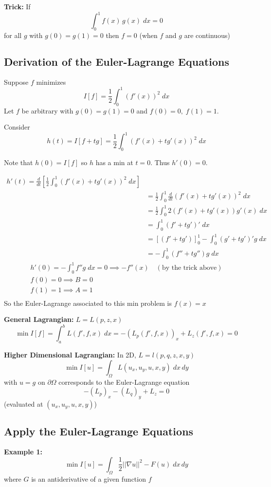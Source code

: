 \documentclass[10pt]{article}
\begin{document}
\textbf{Trick:} If 
\[\int_0^1 f(x)\, g(x)\; dx =0\]
for all $g$ with $g(0) = g(1) = 0$ then $f = 0$ (when $f$ and $g$ are continuous)

\subsection{Derivation of the Euler-Lagrange Equations}
Suppose $f$ minimizes 
\[I[f] = \frac{1}{2}\int_0^1 (f'(x))^2\; dx\]
Let $f$ be arbitrary with $g(0) = g(1) = 0$ and $f(0) = 0, \; f(1) = 1$. 

Consider 
\[h(t) = I[f + tg] = \frac{1}{2}\int_0^1 (f'(x) + tg'(x))^2\; dx\]

Note that $h(0) = I[f]$ so $h$ has a min at $t= 0$. Thus $h'(0) = 0$.

\begin{align*}
    h'(t) = \frac{d}{dt}\left[\frac{1}{2}\int_0^1(f'(x) + tg'(x))^2\; dx\right]\\
    &= \frac{1}{2}\int_0^1 \frac{d}{dt}(f'(x)+ tg'(x))^2\; dx\\
    &= \frac{1}{2}\int_0^1 2(f'(x) + tg'(x))g'(x)\; dx\\
    &= \int_0^1 (f' + tg')'\; dx\\
    &= [(f' + tg')]_0^1 - \int_0^1(g' + tg')' g\; dx\\
    &= -\int_0^1 (f'' + tg'')g\; dx
\end{align*}
\begin{gather*}
    h'(0) = -\int_0^1f''g\; dx = 0 \implies -f''(x) \quad (\text{by the trick above})\\
    f(0) = 0 \implies B =0\\
    f(1) = 1 \implies A = 1\\
\end{gather*}
So the Euler-Lagrange associated to this min problem is $f(x) = x$

\textbf{General Lagrangian:} $L = L(p,z,x)$ 
\[\min I[f] = \int_a^b L(f', f, x)\; dx = -(L_p(f', f, x))_x + L_z(f', f, x) = 0\]

\textbf{Higher Dimensional Lagrangian:} In 2D, $L = l(p, q, z, x, y)$
\[\min I[u] = \int_{\Omega}L(u_x, u_y, u, x, y)\; dx\, dy\]
with $u = g$ on $\partial \Omega$ corresponds to the Euler-Lagrange equation 
\[-(L_p)_x - (L_q)_y + L_z =0\]
(evaluated at $(u_x, u_y, u, x, y)$)

\subsection{Apply the Euler-Lagrange Equations}
\textbf{Example 1:} 
\[\min I[u] = \int_{\Omega} \frac{1}{2}||\nabla u||^2 - F(u)\; dx\, dy\]
where $G$ is an antiderivative of a given function $f$
\end{document}

